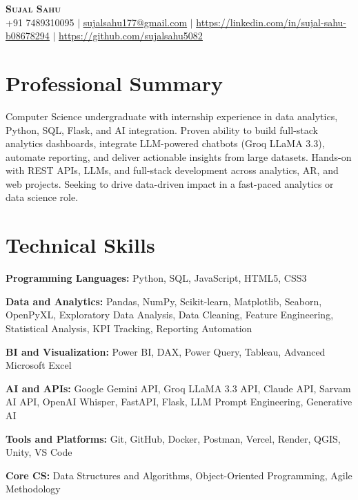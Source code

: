 \documentclass[letterpaper,10.5pt]{article}
\begin{document}

\begin{center}
  {\Huge\bfseries\scshape Sujal Sahu}\\[4pt]
  \small
  +91 7489310095
  \;$|$\;
  \href{mailto:sujalsahu177@gmail.com}{\underline{sujalsahu177@gmail.com}}
  \;$|$\;
  \href{https://linkedin.com/in/sujal-sahu-b08678294}{\underline{https://linkedin.com/in/sujal-sahu-b08678294}}
  \;$|$\;
  \href{https://github.com/sujalsahu5082}{\underline{https://github.com/sujalsahu5082}}
\end{center}

\vspace{-4pt}

\section{Professional Summary}
\vspace{2pt}
\small{
  Computer Science undergraduate with internship experience in data analytics, Python, SQL, Flask, and AI integration. Proven ability to build full-stack analytics dashboards, integrate LLM-powered chatbots (Groq LLaMA 3.3), automate reporting, and deliver actionable insights from large datasets. Hands-on with REST APIs, LLMs, and full-stack development across analytics, AR, and web projects. Seeking to drive data-driven impact in a fast-paced analytics or data science role.
}

\vspace{3pt}

\section{Technical Skills}
\vspace{2pt}
\begin{itemize}[leftmargin=0.13in, label={}, itemsep=2pt, topsep=0pt]
  \small{
    \item \textbf{Programming Languages:}   Python, SQL, JavaScript, HTML5, CSS3
    \item \textbf{Data and Analytics:}      Pandas, NumPy, Scikit-learn, Matplotlib, Seaborn, OpenPyXL, Exploratory Data Analysis, Data Cleaning, Feature Engineering, Statistical Analysis, KPI Tracking, Reporting Automation
    \item \textbf{BI and Visualization:}    Power BI, DAX, Power Query, Tableau, Advanced Microsoft Excel
    \item \textbf{AI and APIs:}             Google Gemini API, Groq LLaMA 3.3 API, Claude API, Sarvam AI API, OpenAI Whisper, FastAPI, Flask, LLM Prompt Engineering, Generative AI
    \item \textbf{Tools and Platforms:}     Git, GitHub, Docker, Postman, Vercel, Render, QGIS, Unity, VS Code
    \item \textbf{Core CS:}                 Data Structures and Algorithms, Object-Oriented Programming, Agile Methodology
  }
\end{itemize}
\end{document}

